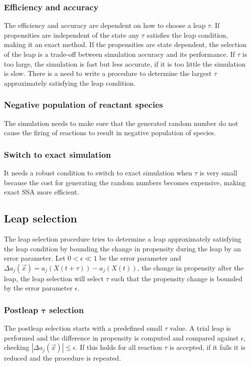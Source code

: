     \subsubsection{Efficiency and accuracy}
    The efficiency and accuracy are dependent on how to choose a leap $\tau$.
    If propensities are independent of the state any $\tau$ satisfies the leap condition, making it an exact method.
    If the propensities are state dependent, the selection of the leap is a trade-off between simulation accuracy and its performance.
    If $\tau$ is too large, the simulation is fast but less accurate, if it is too little the simulation is slow.
    There is a need to write a procedure to determine the largest $\tau$ approximately satisfying the leap condition.

    \subsubsection{Negative population of reactant species}
    The simulation needs to make sure that the generated random number do not cause the firing of reactions to result in negative population of species.

    \subsubsection{Switch to exact simulation}
    It needs a robust condition to switch to exact simulation when $\tau$ is very small because the cost for generating the random numbers becomes expensive, making exact SSA more efficient.

  \subsection{Leap selection}
  The leap selection procedure tries to determine a leap approximately satisfying the leap condition by bounding the change in propensity during the leap by an error parameter.
  Let $0<\epsilon\ll 1$ be the error parameter and $\Delta a_j(\vec{x}) = a_j(X(t+\tau))-a_j(X(t))$, the change in propensity after the leap, the leap selection will select $\tau$ such that the propensity change is bounded by the error parameter $\epsilon$.

    \subsubsection{Postleap $\mathbf{\tau}$ selection}
    The postleap selection starts with a predefined small $\tau$ value.
    A trial leap is performed and the difference in propensity is computed and compared against $\epsilon$, checking $|\Delta a_j(\vec{x})|\le \epsilon$.
    If this holds for all reaction $\tau$ is accepted, if it fails it is reduced and the procedure is repeated.

